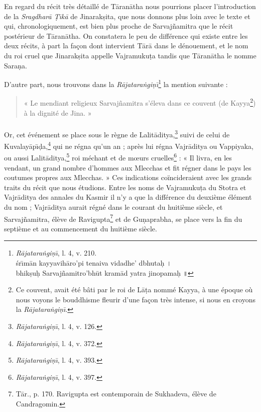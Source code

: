 \documentclass[a4paper, 11pt, oneside, french]{article}
\begin{document}
En regard du récit très détaillé de T\={a}ran\={a}tha nous pourrions placer l'introduction de la \emph{Sragdhar\={a} Ṭ\={\i}k\={a}} de Jinarak\d{s}ita, que nous donnons plus loin avec le texte et qui, chronologiquement, est bien plus proche de Sarvaj\~{n}amitra que le récit postérieur de T\={a}ran\={a}tha. On constatera le peu de différence qui existe entre les deux récits, à part la façon dont intervient T\={a}r\={a} dans le dénouement, et le nom du roi cruel que Jinarak\d{s}ita appelle Vajramuku\d{t}a tandis que T\={a}ran\={a}tha le nomme Sara\d{n}a.

D'autre part, nous trouvons dans la \emph{R\={a}jatara\.{n}gi\d{n}\={\i}}\footnote{\emph{R\={a}jatara\.{n}gi\d{n}\={\i}}, l. 4, v. 210.\\\hspace*{10mm}\'{s}r\={\i}m\={a}n kayyavih\={a}ro'pi tenaiva vidadhe' dbhuta\d{h} \texthindi{।}\\\hspace*{10mm}bhik\d{s}u\d{h} Sarvaj\~{n}amitro'bh\={u}t kram\={a}d yatra jinopama\d{h} \texthindi{॥}} la mention suivante :
\begin{quotation}
« Le mendiant religieux Sarvaj\~{n}amitra s'éleva dans ce couvent (de Kayya\footnote{Ce couvent, avait été bâti par le roi de L\={a}\d{t}a nommé Kayya, à une époque où nous voyons le bouddhisme fleurir d'une façon très intense, si nous en croyons la \emph{R\={a}jatara\.{n}gi\d{n}\={\i}}.}) à la dignité de Jina. »
\end{quotation}
\paragraph{}
Or, cet événement se place sous le règne de Lalit\={a}ditya,\footnote{\emph{R\={a}jatara\.{n}gi\d{n}\={\i}}, l. 4, v. 126.} suivi de celui de Kuvalay\={a}p\={\i}\d{d}a,\footnote{\emph{R\={a}jatara\.{n}gi\d{n}\={\i}}, l. 4, v. 372.} qui ne régna qu'un an ; après lui régna Vajr\={a}ditya ou Vappiyaka, ou aussi Lalit\={a}ditya,\footnote{\emph{R\={a}jatara\.{n}gi\d{n}\={\i}}, l. 4, v. 393.} roi méchant et de mœurs cruelles\footnote{\emph{R\={a}jatara\.{n}gi\d{n}\={\i}}, l. 4, v. 397.} : « Il livra, en les vendant, un grand nombre d'hommes aux Mlecchas et fit régner dans le pays les coutumes propres aux Mlecchas. » Ces indications coïncideraient avec les grands traits du récit que nous étudions. Entre les noms de Vajramuku\d{t}a du Stotra et Vajr\={a}ditya des annales du Kasmir il n'y a que la différence du deuxième élément du nom ; Vajr\={a}ditya aurait régné dans le courant du huitième siècle, et Sarvaj\~{n}amitra, élève de Ravigupta\footnote{T\={a}r., p. 170. Ravigupta est contemporain de Sukhadeva, élève de Candragomin.} et de Gu\d{n}aprabha, se place vers la fin du septième et au commencement du huitième siècle.
\end{document}
